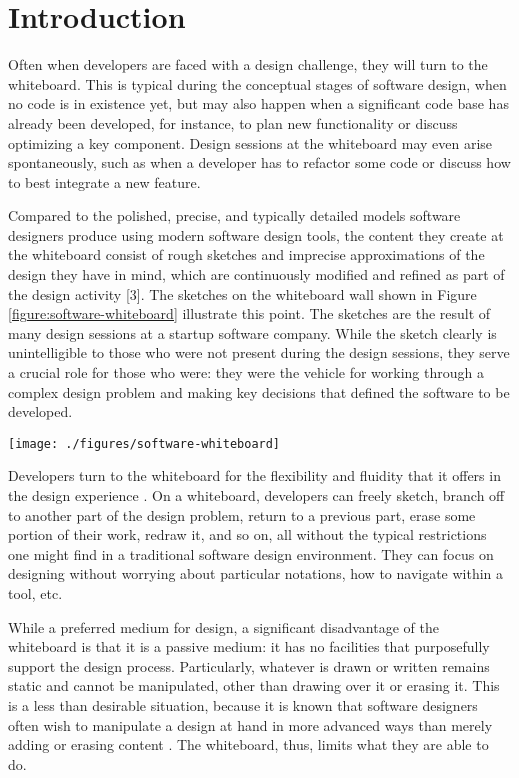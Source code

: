 \chapter{Introduction}
\label{chapter:introduction}

Often when developers are faced with a design challenge, they will turn to the whiteboard.  This is typical during the conceptual stages of software design, when no code is in existence yet, but may also happen when a significant code base has already been developed, for instance, to plan new functionality or discuss optimizing a key component. Design sessions at the whiteboard may even arise spontaneously, such as when a developer has to refactor some code or discuss how to best integrate a new feature.

Compared to the polished, precise, and typically detailed models software designers produce using modern software design tools, the content they create at the whiteboard consist of rough sketches and imprecise approximations of the design they have in mind, which are continuously modified and refined as part of the design activity [3]. The sketches on the whiteboard wall shown in Figure \ref{figure:software-whiteboard} illustrate this point. The sketches are the result of many design sessions at a startup software company. While the sketch clearly is unintelligible to those who were not present during the design sessions, they serve a crucial role for those who were: they were the vehicle for working through a complex design problem and making key decisions that defined the software to be developed.

\begin{figure*}[tbh]
  \centering
  \texttt{[image: ./figures/software-whiteboard]}
  \caption{Whiteboard wall at a startup company.}
  \label{figure:software-whiteboard}
\end{figure*}

Developers turn to the whiteboard for the flexibility and fluidity that it offers in the design experience \cite{cherubini2007let}. On a whiteboard, developers can freely sketch, branch off to another part of the design problem, return to a previous part, erase some portion of their work, redraw it, and so on, all without the typical restrictions one might find in a traditional software design environment. They can focus on designing without worrying about particular notations, how to navigate within a tool, etc.

While a preferred medium for design, a significant disadvantage of the whiteboard is that it is a passive medium: it has no facilities that purposefully support the design process. Particularly, whatever is drawn or written remains static and cannot be manipulated, other than drawing over it or erasing it. This is a less than desirable situation, because it is known that software designers often wish to manipulate a design at hand in more advanced ways than merely adding or erasing content \cite{dekel2007notation}. The whiteboard, thus, limits what they are able to do.

